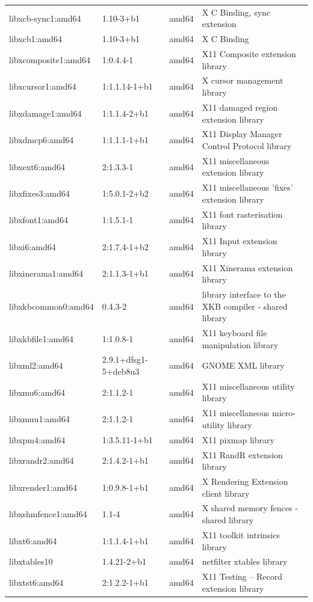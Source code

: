 \documentclass[a4paper,10pt]{article}
\begin{document}
\begin{appendices}
{\begin{longtable}{p{3.25cm}@{\hspace{0.25cm}}p{4cm}@{\hspace{0.25cm}}l@{\hspace{0.25cm}}p{7cm}}
libxcb-sync1:amd64	&	1.10-3+b1	&	amd64	&	X C Binding, sync extension	\\
libxcb1:amd64	&	1.10-3+b1	&	amd64	&	X C Binding	\\
libxcomposite1:amd64	&	1:0.4.4-1	&	amd64	&	X11 Composite extension library	\\
libxcursor1:amd64	&	1:1.1.14-1+b1	&	amd64	&	X cursor management library	\\
libxdamage1:amd64	&	1:1.1.4-2+b1	&	amd64	&	X11 damaged region extension library	\\
libxdmcp6:amd64	&	1:1.1.1-1+b1	&	amd64	&	X11 Display Manager Control Protocol library	\\
libxext6:amd64	&	2:1.3.3-1	&	amd64	&	X11 miscellaneous extension library	\\
libxfixes3:amd64	&	1:5.0.1-2+b2	&	amd64	&	X11 miscellaneous 'fixes' extension library	\\
libxfont1:amd64	&	1:1.5.1-1	&	amd64	&	X11 font rasterisation library	\\
libxi6:amd64	&	2:1.7.4-1+b2	&	amd64	&	X11 Input extension library	\\
libxinerama1:amd64	&	2:1.1.3-1+b1	&	amd64	&	X11 Xinerama extension library	\\
libxkbcommon0:amd64	&	0.4.3-2	&	amd64	&	library interface to the XKB compiler - shared library	\\
libxkbfile1:amd64	&	1:1.0.8-1	&	amd64	&	X11 keyboard file manipulation library	\\
libxml2:amd64	&	2.9.1+dfsg1-5+deb8u3	&	amd64	&	GNOME XML library	\\
libxmu6:amd64	&	2:1.1.2-1	&	amd64	&	X11 miscellaneous utility library	\\
libxmuu1:amd64	&	2:1.1.2-1	&	amd64	&	X11 miscellaneous micro-utility library	\\
libxpm4:amd64	&	1:3.5.11-1+b1	&	amd64	&	X11 pixmap library	\\
libxrandr2:amd64	&	2:1.4.2-1+b1	&	amd64	&	X11 RandR extension library	\\
libxrender1:amd64	&	1:0.9.8-1+b1	&	amd64	&	X Rendering Extension client library	\\
libxshmfence1:amd64	&	1.1-4	&	amd64	&	X shared memory fences - shared library	\\
libxt6:amd64	&	1:1.1.4-1+b1	&	amd64	&	X11 toolkit intrinsics library	\\
libxtables10	&	1.4.21-2+b1	&	amd64	&	netfilter xtables library	\\
libxtst6:amd64	&	2:1.2.2-1+b1	&	amd64	&	X11 Testing -- Record extension library	\\

\end{longtable}}
\end{appendices}
\end{document}
